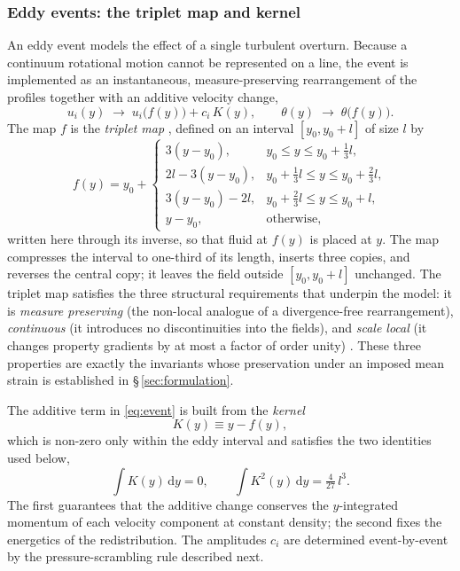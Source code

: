 \documentclass[lineno]{JFM-FLM_Au}
\begin{document}
\subsubsection{Eddy events: the triplet map and kernel}

An eddy event models the effect of a single turbulent overturn. Because a
continuum rotational motion cannot be represented on a line, the event is
implemented as an instantaneous, measure-preserving rearrangement of the
profiles together with an additive velocity change,
\begin{equation}
  u_i(y)\;\longrightarrow\;u_i\!\big(f(y)\big)+c_i\,K(y),
  \qquad
  \theta(y)\;\longrightarrow\;\theta\!\big(f(y)\big).
  \label{eq:event}
\end{equation}
The map $f$ is the \emph{triplet map} \citep{Kerstein1991,Kerstein1999},
defined on an interval $[y_0,y_0+l]$ of size $l$ by
\begin{equation}
  f(y)=y_0+
  \begin{cases}
    3(y-y_0), & y_0\le y\le y_0+\tfrac{1}{3}l,\\[2pt]
    2l-3(y-y_0), & y_0+\tfrac{1}{3}l\le y\le y_0+\tfrac{2}{3}l,\\[2pt]
    3(y-y_0)-2l, & y_0+\tfrac{2}{3}l\le y\le y_0+l,\\[2pt]
    y-y_0, & \text{otherwise,}
  \end{cases}
  \label{eq:triplet}
\end{equation}
written here through its inverse, so that fluid at $f(y)$ is placed at $y$.
The map compresses the interval to one-third of its length, inserts three
copies, and reverses the central copy; it leaves the field outside
$[y_0,y_0+l]$ unchanged. The triplet map satisfies the three structural
requirements that underpin the model: it is \emph{measure preserving} (the
non-local analogue of a divergence-free rearrangement), \emph{continuous}
(it introduces no discontinuities into the fields), and \emph{scale local}
(it changes property gradients by at most a factor of order unity)
\citep{Kerstein2001}. These three properties are exactly the invariants
whose preservation under an imposed mean strain is established in
\S\,\ref{sec:formulation}.

The additive term in \eqref{eq:event} is built from the \emph{kernel}
\begin{equation}
  K(y)\equiv y-f(y),
  \label{eq:kernel}
\end{equation}
which is non-zero only within the eddy interval and satisfies the two
identities used below,
\begin{equation}
  \int K(y)\,\mathrm{d}y = 0,
  \qquad
  \int K^2(y)\,\mathrm{d}y = \tfrac{4}{27}\,l^{3}.
  \label{eq:kernel-identities}
\end{equation}
The first guarantees that the additive change conserves the $y$-integrated
momentum of each velocity component at constant density; the second fixes
the energetics of the redistribution. The amplitudes $c_i$ are determined
event-by-event by the pressure-scrambling rule described next.
\end{document}
